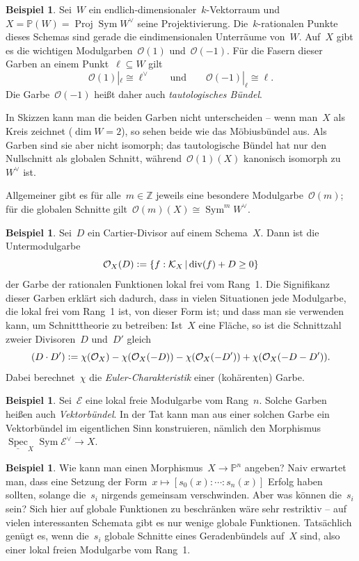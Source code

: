 \documentclass[a4paper,ngerman,12pt]{scrartcl}
\theoremstyle{definition}
\newtheorem{ex}[defn]{Beispiel}
\theoremstyle{plain}
\theoremstyle{remark}
\newcommand{\ZZ}{\mathbb{Z}}
\newcommand{\PP}{\mathbb{P}}
\newcommand{\E}{\mathcal{E}}
\newcommand{\K}{\mathcal{K}}
\renewcommand{\O}{\mathcal{O}}
\newcommand{\ul}[1]{\underline{#1}}
\DeclareMathOperator{\Spec}{Spec}
\DeclareMathOperator{\Proj}{Proj}
\DeclareMathOperator{\Sym}{Sym}
\newcommand{\defeq}{\vcentcolon=}
\begin{document}
\begin{ex}Sei~$W$ ein endlich-dimensionaler~$k$-Vektorraum und~$X = \PP(W) =
\Proj \Sym W^\vee$ seine Projektivierung. Die~$k$-rationalen Punkte dieses
Schemas sind gerade die eindimensionalen Unterräume von~$W$. Auf~$X$ gibt es
die wichtigen Modulgarben~$\O(1)$ und~$\O(-1)$. Für die Fasern dieser Garben an
einem Punkt~$\ell \subseteq W$ gilt
\[ \O(1)|_\ell \cong \ell^\vee \qquad\text{und}\qquad \O(-1)|_\ell \cong \ell. \]
Die Garbe~$\O(-1)$ heißt daher auch \emph{tautologisches Bündel}.

In Skizzen kann man die beiden Garben nicht unterscheiden -- wenn man~$X$ als
Kreis zeichnet ($\dim W = 2$), so sehen beide wie das Möbiusbündel aus. Als
Garben sind sie aber nicht isomorph; das tautologische Bündel hat nur den
Nullschnitt als globalen Schnitt, während~$\O(1)(X)$ kanonisch isomorph
zu~$W^\vee$ ist.

Allgemeiner gibt es für alle~$m \in \ZZ$ jeweils eine besondere
Modulgarbe~$\O(m)$; für die globalen Schnitte gilt~$\O(m)(X) \cong \Sym^m
W^\vee$.\end{ex}

\begin{ex}Sei~$D$ ein Cartier-Divisor auf einem Schema~$X$. Dann ist die
Untermodulgarbe
\[ \O_X(D) \defeq \{ f : \K_X \,|\, \mathrm{div}(f) + D \geq 0 \} \]
der Garbe der rationalen Funktionen lokal frei vom Rang~1. Die Signifikanz
dieser Garben erklärt sich dadurch, dass in vielen Situationen jede Modulgarbe,
die lokal frei vom Rang~1 ist, von dieser Form ist; und dass man sie verwenden
kann, um Schnitttheorie zu betreiben: Ist~$X$ eine Fläche, so ist die
Schnittzahl zweier Divisoren~$D$ und~$D'$ gleich
\[ (D \cdot D') \defeq \chi(\O_X) - \chi(\O_X(-D)) - \chi(\O_X(-D')) + \chi(\O_X(-D-D')). \]
Dabei berechnet~$\chi$ die \emph{Euler-Charakteristik} einer (kohärenten)
Garbe.
\end{ex}

\begin{ex}Sei~$\E$ eine lokal freie Modulgarbe vom Rang~$n$. Solche Garben
heißen auch \emph{Vektorbündel}. In der Tat kann man aus einer solchen Garbe
ein Vektorbündel im eigentlichen Sinn konstruieren, nämlich den
Morphismus~$\ul{\Spec}_X \Sym \E^\vee \to X$.\end{ex}

\begin{ex}Wie kann man einen Morphismus~$X \to \PP^n$ angeben? Naiv erwartet
man, dass eine Setzung der Form~$x \mapsto [s_0(x) : \cdots : s_n(x)]$ Erfolg
haben sollten, solange die~$s_i$ nirgends gemeinsam verschwinden. Aber was
können die~$s_i$ sein? Sich hier auf globale Funktionen zu beschränken wäre
sehr restriktiv -- auf vielen interessanten Schemata gibt es nur wenige globale
Funktionen. Tatsächlich genügt es, wenn die~$s_i$ globale Schnitte eines
Geradenbündels auf~$X$ sind, also einer lokal freien Modulgarbe vom Rang~1.\end{ex}
\end{document}
